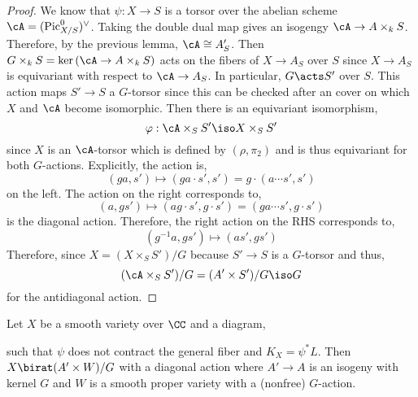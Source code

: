 \documentclass[12pt]{article}
\begin{document}
\begin{proof}
We know that $\psi : X \to S$ is a torsor over the abelian scheme $\cA = (\fPic^0_{X/S})^\vee$. Taking the double dual map gives an isogengy $\cA \to A \times_k S$. Therefore, by the previous lemma, $\cA \cong A'_S$. Then $G \times_k S = \ker{(\cA \to A \times_k S)}$ acts on the fibers of $X \to A_S$ over $S$ since $X \to A_S$ is equivariant with respect to $\cA \to A_S$. In particular, $G \acts S'$ over $S$. This action maps $S' \to S$ a $G$-torsor since this can be checked after an \etale cover on which $X$ and $\cA$ become isomorphic. Then there is an equivariant isomorphism,
\[ \varphi : \cA \times_S S' \iso X \times_S S' \]
since $X$ is an $\cA$-torsor which is defined by $(\rho, \pi_2)$ and is thus equivariant for both $G$-actions. Explicitly, the action is,
\[  (g a, s') \mapsto (ga \cdot s', s') = g \cdot (a \cdots s', s') \]
on the left. The action on the right corresponds to,
\[ (a, g s') \mapsto ( ag \cdot s', g  \cdot s') = (g a \cdots s', g \cdot s') \]
is the diagonal action. Therefore, the right action on the RHS corresponds to,
\[ (g^{-1} a, g s') \mapsto (a s', g s') \]
Therefore, since $X = (X \times_S S') / G$ because $S' \to S$ is a $G$-torsor and thus,
\[ (\cA \times_S S') / G = (A' \times S') / G \iso G \]
for the antidiagonal action. 
\end{proof}

\begin{prop}
Let $X$ be a smooth variety over $\CC$ and a diagram,
\begin{center}
\end{center}
such that $\psi$ does not contract the general fiber and $K_X = \psi^* L$. Then $X \birat (A' \times W) / G$ with a diagonal action where $A' \to A$ is an isogeny with kernel $G$ and $W$ is a smooth proper variety with a (nonfree) $G$-action.
\end{prop}
\end{document}
